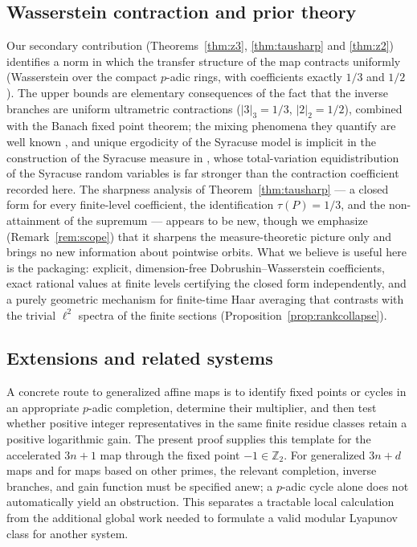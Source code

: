 \documentclass[11pt]{amsart}
\theoremstyle{definition}
\theoremstyle{remark}
\newcommand{\Z}{\mathbb{Z}}
\newcommand{\Ztwo}{\Z_2}
\begin{document}
\subsection*{Wasserstein contraction and prior theory}
Our secondary contribution (Theorems~\ref{thm:z3}, \ref{thm:tausharp} and \ref{thm:z2}) identifies a norm in which the transfer structure of the map contracts uniformly (Wasserstein over the compact $p$-adic rings, with coefficients exactly $1/3$ and $1/2$). The upper bounds are elementary consequences of the fact that the inverse branches are uniform ultrametric contractions ($|3|_3 = 1/3$, $|2|_2 = 1/2$), combined with the Banach fixed point theorem; the mixing phenomena they quantify are well known \cite{terras1976,wirsching1998,matthewswatts1985,kingsberyetal2011,tao2022}, and unique ergodicity of the Syracuse model is implicit in the construction of the Syracuse measure in \cite{tao2022}, whose total-variation equidistribution of the Syracuse random variables is far stronger than the contraction coefficient recorded here. The sharpness analysis of Theorem~\ref{thm:tausharp} --- a closed form for every finite-level coefficient, the identification $\tau(P) = 1/3$, and the non-attainment of the supremum --- appears to be new, though we emphasize (Remark~\ref{rem:scope}) that it sharpens the measure-theoretic picture only and brings no new information about pointwise orbits. What we believe is useful here is the packaging: explicit, dimension-free Dobrushin--Wasserstein coefficients, exact rational values at finite levels certifying the closed form independently, and a purely geometric mechanism for finite-time Haar averaging that contrasts with the trivial $\ell^2$ spectra of the finite sections (Proposition~\ref{prop:rankcollapse}).

\subsection*{Extensions and related systems}
A concrete route to generalized affine maps is to identify fixed points or cycles in an appropriate $p$-adic completion, determine their multiplier, and then test whether positive integer representatives in the same finite residue classes retain a positive logarithmic gain. The present proof supplies this template for the accelerated $3n+1$ map through the fixed point $-1\in\Ztwo$. For generalized $3n+d$ maps and for maps based on other primes, the relevant completion, inverse branches, and gain function must be specified anew; a $p$-adic cycle alone does not automatically yield an obstruction. This separates a tractable local calculation from the additional global work needed to formulate a valid modular Lyapunov class for another system.
\end{document}
